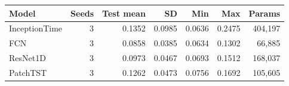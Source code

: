 \begin{tabular}{lrrrrrr}
\toprule
Model & Seeds & Test mean & SD & Min & Max & Params \\
\midrule
InceptionTime & 3 & 0.1352 & 0.0985 & 0.0636 & 0.2475 & 404,197 \\
FCN & 3 & 0.0858 & 0.0385 & 0.0634 & 0.1302 & 66,885 \\
ResNet1D & 3 & 0.0973 & 0.0467 & 0.0693 & 0.1512 & 168,037 \\
PatchTST & 3 & 0.1262 & 0.0473 & 0.0756 & 0.1692 & 105,605 \\
\bottomrule
\end{tabular}
